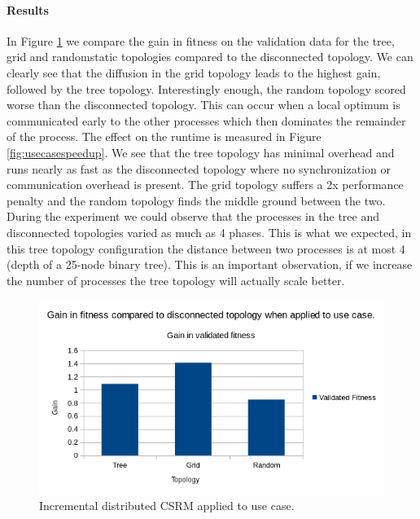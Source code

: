 \paragraph{Results}
In Figure \ref{fig:usecasedistributed} we compare the gain in fitness on the validation data for the tree, grid and randomstatic topologies compared to the disconnected topology. We can clearly see that the diffusion in the grid topology leads to the highest gain, followed by the tree topology. Interestingly enough, the random topology scored worse than the disconnected topology. This can occur when a local optimum is communicated early to the other processes which then dominates the remainder of the process. The effect on the runtime is measured in Figure \ref{fig:usecasespeedup}. We see that the tree topology has minimal overhead and runs nearly as fast as the disconnected topology where no synchronization or communication overhead is present. The grid topology suffers a 2x performance penalty and the random topology finds the middle ground between the two. During the experiment we could observe that the processes in the tree and disconnected topologies varied as much as 4 phases. This is what we expected, in this tree topology configuration the distance between two processes is at most 4 (depth of a 25-node binary tree). This is an important observation, if we increase the number of processes the tree topology will actually scale better.
\begin{figure}
    \centering
    \includegraphics[width=\textwidth,height=\textheight,keepaspectratio]{figures/usecasedistributed.png}
    \caption{Incremental distributed CSRM applied to use case.}
    \label{fig:usecasedistributed}
\end{figure}
